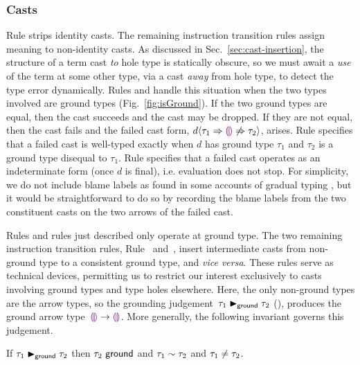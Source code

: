 

\subsubsection{Casts}
Rule  strips identity casts. The remaining instruction
transition rules assign meaning to non-identity casts.
%
As discussed in Sec.~\ref{sec:cast-insertion}, the structure of a term
cast \emph{to} hole type is statically obscure,
%
so we must await a \emph{use} of the term at some other type, via a
cast \emph{away} from hole type, to detect the type error dynamically.
%
Rules  and  handle this situation when the
two types involved are ground types (Fig.~\ref{fig:isGround}).
%
If the two ground types are equal, then the cast succeeds and the cast
may be dropped.
%
If they are not equal, then the cast fails and the failed cast form,
$d \langle{\tau_1}\Rightarrow{\textcolor{violet}{\llparenthesis}\textcolor{violet}{\rrparenthesis}}\not\Rightarrow{\tau_2}\rangle$, arises.
%
Rule  specifies that a failed cast is well-typed exactly
when $d$ has ground type $\tau_1$ and $\tau_2$ is a ground type
disequal to $\tau_1$.
%
Rule  specifies that a failed cast operates as an
indeterminate form (once $d$ is final), i.e. evaluation does not stop. For simplicity, we do not include blame labels as found in some accounts of gradual typing \cite{DBLP:conf/esop/WadlerF09,DBLP:conf/snapl/SiekVCB15}, but it would be straightforward to do so by recording the blame labels from the two constituent casts on the two arrows of the failed cast.

Rules  and  rules just described only operate at ground type.
%
The two remaining instruction transition rules, Rule~
and~, insert intermediate casts from non-ground type to a
consistent ground type, and \emph{vice versa}.
%
These rules serve as technical devices, permitting us to restrict our
interest exclusively to casts involving ground types and type holes elsewhere.
%
Here, the only non-ground types are the arrow types, so the grounding
judgement~$\tau_1 \blacktriangleright_{\mathsf{ground}} \tau_2$ (),
produces the ground arrow type~$\textcolor{violet}{\llparenthesis}\textcolor{violet}{\rrparenthesis} \rightarrow \textcolor{violet}{\llparenthesis}\textcolor{violet}{\rrparenthesis}$.
%
More generally, the following invariant governs this judgement.
\begin{lem}[Grounding]
  If $\tau_1 \blacktriangleright_{\mathsf{ground}} \tau_2$
  then $\tau_2~\mathsf{ground}$
  and $\tau_1 \sim \tau_2$
  and $\tau_1\neq\tau_2$.
\end{lem}

